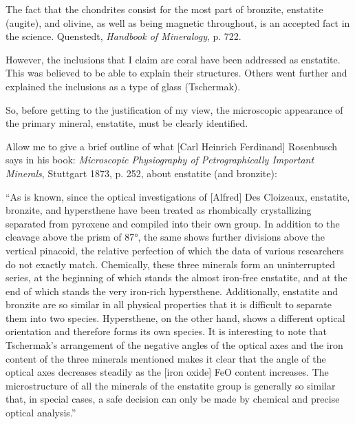 \documentclass[a4paper, 12pt, oneside]{article}
\begin{document}
The fact that the chondrites consist for the most part of bronzite, enstatite (augite), and olivine, as well as being magnetic throughout, is an accepted fact in the science. Quenstedt, \emph{Handbook of Mineralogy}, p. 722.

However, the inclusions that I claim are coral have been addressed as enstatite. This was believed to be able to explain their structures. Others went further and explained the inclusions as a type of glass (Tschermak).

So, before getting to the justification of my view, the microscopic appearance of the primary mineral, enstatite, must be clearly identified.

Allow me to give a brief outline of what [Carl Heinrich Ferdinand] Rosenbusch says in his book: \emph{Microscopic Physiography of Petrographically Important Minerals}, Stuttgart 1873, p. 252, about enstatite (and bronzite):

``As is known, since the optical investigations of [Alfred] Des Cloizeaux, enstatite, bronzite, and hypersthene have been treated as rhombically crystallizing separated from pyroxene and compiled into their own group. In addition to the cleavage above the prism of 87°, the same shows further divisions above the vertical pinacoid, the relative perfection of which the data of various researchers do not exactly match. Chemically, these three minerals form an uninterrupted series, at the beginning of which stands the almost iron-free enstatite, and at the end of which stands the very iron-rich hypersthene. Additionally, enstatite and bronzite are so similar in all physical properties that it is difficult to separate them into two species. Hypersthene, on the other hand, shows a different optical orientation and therefore forms its own species. It is interesting to note that Tschermak's arrangement of the negative angles of the optical axes and the iron content of the three minerals mentioned makes it clear that the angle of the optical axes decreases steadily as the [iron oxide] FeO content increases. The microstructure of all the minerals of the enstatite group is generally so similar that, in special cases, a safe decision can only be made by chemical and precise optical analysis.''
\end{document}
